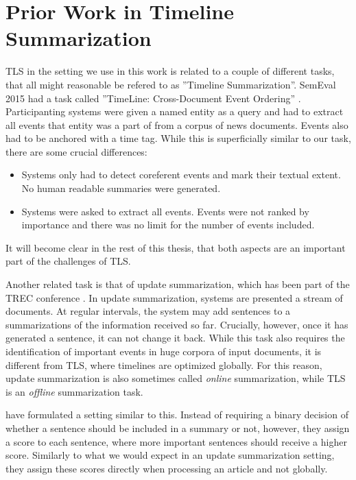 \documentclass[a4paper,BCOR=10mm]{report}
\numberwithin{lemma}{chapter}
\numberwithin{definition}{chapter}
\begin{document}
\section{Prior Work in Timeline Summarization} \label{sec:prior-work-tl} 


TLS in the setting we use in this work is related to a couple of different tasks, that all might reasonable be refered to as ''Timeline Summarization''.
SemEval 2015 had a task called ''TimeLine: Cross-Document Event Ordering'' \citep{semeval-timeline}. Participanting systems were given a named entity as a query and had to extract all events that entity was a part of from a corpus of news documents. Events also had to be anchored with a time tag.
While this is superficially similar to our task, there are some crucial differences:

\begin{itemize}
    \item{Systems only had to detect coreferent events and mark their textual extent. No human readable summaries were generated. }
    \item{Systems were asked to extract all events. Events were not ranked by importance and there was no limit for the number of events included. }
\end{itemize}

It will become clear in the rest of this thesis, that both aspects are an important part of the challenges of TLS.

Another related task is that of update summarization, which has been part of the TREC conference \citep{trec-update}.
In update summarization, systems are presented a stream of documents.
At regular intervals, the system may add sentences to a summarizations of the information received so far.
Crucially, however, once it has generated a sentence, it can not change it back.
While this task also requires the identification of important events in huge corpora of input documents, it is different from TLS, where timelines are optimized globally. For this reason, update summarization is also sometimes called \textit{online} summarization, while TLS is an \textit{offline} summarization task.

\citet{swan+allen-temporal-summaries} have formulated a setting similar to this. Instead of requiring a binary decision of whether a sentence should be included in a summary or not, however, they assign a score to each sentence, where more important sentences should receive a higher score. Similarly to what we would expect in an update summarization setting, they assign these scores directly when processing an article and not globally.
\end{document}

